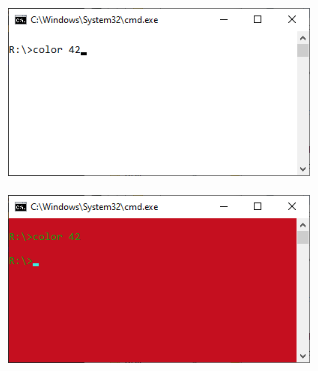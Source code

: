 

\begin{center}
    \begin{minipage}[t]{.49\textwidth}
        \centering
        \includegraphics[width=8cm]{_input/7/white-black-cmd.png}
    \end{minipage}
    \begin{minipage}[t]{.49\textwidth}
        \centering
        \includegraphics[width=8cm]{_input/7/color_42.png}
    \end{minipage}
\end{center}

